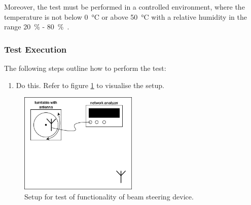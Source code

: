Moreover, the test must be performed in a controlled environment, where the temperature is not below \SI{0}{\celsius} or above \SI{50}{\celsius} with a relative humidity in the range \SI{20}{\percent} - \SI{80}{\percent}~\cite{hrt_i_data_sheet}.

\subsubsection{Test Execution}
The following steps outline how to perform the test:

\begin{enumerate}
    \item Do this. Refer to figure \ref{fig:experiment-setup} to visualise the setup.
\end{enumerate}

\begin{figure}[h]
    \centering
    \includegraphics[width=0.5\textwidth]{figures/experiment-setup.png}
    \caption{Setup for test of functionality of beam steering device.} \label{fig:experiment-setup}
\end{figure}